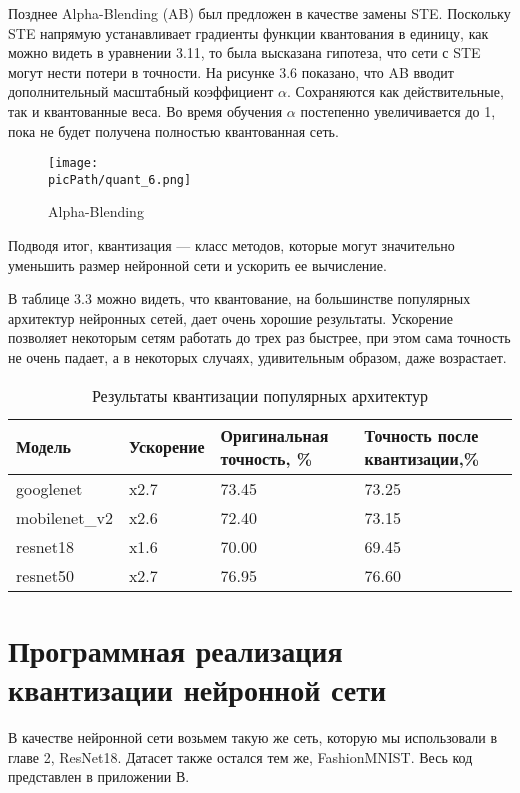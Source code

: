 \documentclass[oneside,final,12pt]{extreport}
\newcommand{\picPath}{images}
\begin{document}
Позднее Alpha-Blending (AB) был предложен в качестве замены STE. Поскольку STE напрямую устанавливает градиенты функции квантования в единицу, как можно видеть в уравнении 3.11, то была высказана гипотеза, что сети с STE могут нести потери в точности. На рисунке 3.6 показано, что AB вводит дополнительный масштабный коэффициент $\alpha$. Сохраняются как действительные, так и квантованные веса. Во время обучения $\alpha$ постепенно увеличивается до 1, пока не будет получена полностью квантованная сеть.
\begin{figure}[H]
\begin{center}
  \texttt{[image: \\picPath/quant\_6.png]}
  \caption{Alpha-Blending}
  \label{fig:quant_6}
 \end{center}
\end{figure}

Подводя итог, квантизация — класс методов, которые могут значительно уменьшить размер нейронной сети и ускорить ее вычисление. 

В таблице 3.3 можно видеть, что квантование, на большинстве популярных архитектур нейронных сетей, дает очень хорошие результаты. Ускорение позволяет некоторым сетям работать до трех раз быстрее, при этом сама точность не очень падает, а в некоторых случаях, удивительным образом, даже возрастает. 

\begin{table}[H]
\caption{Результаты квантизации популярных архитектур}
\label{table_1}
\begin{tabularx}{\textwidth}{|X|X|X|X|} %
\hline
Модель & Ускорение & Оригинальная точность, \% & Точность после квантизации,\% \\ \hline
googlenet & x2.7 & 73.45 & 73.25 \\
mobilenet_v2 & x2.6 & 72.40 & 73.15\\ 
resnet18 & x1.6 & 70.00 & 69.45\\ 
resnet50 & x2.7 & 76.95 & 76.60\\ \hline

\end{tabularx}
\end{table}

\section{Программная реализация квантизации нейронной сети}
В качестве нейронной сети возьмем такую же сеть, которую мы использовали в главе 2, ResNet18. Датасет также остался тем же, FashionMNIST. Весь код представлен в приложении В.
\end{document}

